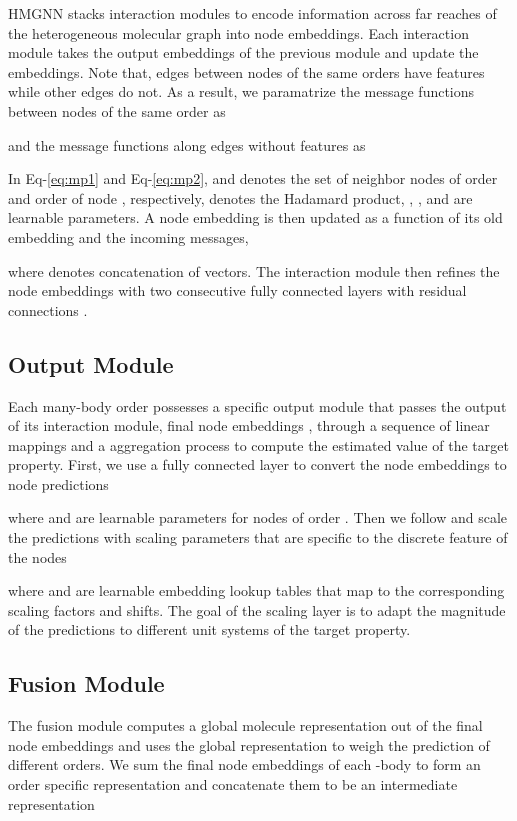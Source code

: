 \documentclass[conference]{IEEEtran}
\begin{document}
HMGNN stacks  interaction modules to encode information across far reaches of the heterogeneous molecular graph into node embeddings. Each interaction module takes the output embeddings of the previous module and update the embeddings. Note that, edges between nodes of the same orders have features while other edges do not. As a result, we paramatrize the message functions between nodes of the same order as

and the message functions along edges without features as

In Eq-\ref{eq:mp1} and Eq-\ref{eq:mp2},  and  denotes the set of neighbor nodes of order  and order  of node , respectively,  denotes the Hadamard product, , , and  are learnable parameters. A node embedding  is then updated as a function of its old embedding and the incoming messages,

where  denotes concatenation of vectors. The interaction module then refines the node embeddings with two consecutive fully connected layers with residual connections \cite{ResNet}. 

\subsection{Output Module}

Each many-body order  possesses a specific output module that passes the output of its interaction module, final node embeddings , through a sequence of linear mappings and a aggregation process to compute the estimated value of the target property. First, we use a fully connected layer to convert the node embeddings to node predictions

where  and  are learnable parameters for nodes of order . Then we follow \cite{unke2019physnet} and scale the predictions with scaling parameters that are specific to the discrete feature  of the nodes

where  and  are learnable embedding lookup tables that map  to the corresponding scaling factors and shifts. The goal of the scaling layer is to adapt the magnitude of the predictions to different unit systems of the target property.

\subsection{Fusion Module} \label{Sec:fuse}

The fusion module computes a global molecule representation out of the final node embeddings and uses the global representation to weigh the prediction of different orders. We sum the final node embeddings  of each -body to form an order specific representation and concatenate them to be an intermediate representation
\end{document}
